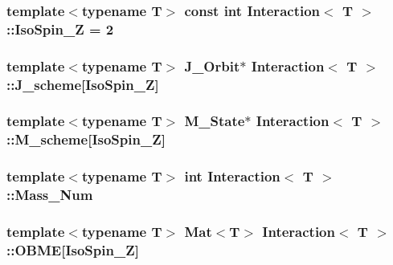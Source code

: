 \hypertarget{class_interaction_a067c62aec0e8fba647d5e5cefb13fadc}{
\subsubsection[{Iso\-Spin\-\_\-\-Z}]{\setlength{\rightskip}{0pt plus 5cm}template$<$typename T$>$ const int {\bf Interaction}$<$ T $>$\-::Iso\-Spin\-\_\-\-Z = 2\hspace{0.3cm}{\ttfamily [static]}}}\label{class_interaction_a067c62aec0e8fba647d5e5cefb13fadc}
\hypertarget{class_interaction_a42d5c1378bd17f7755424f7ab5702ef6}{
\subsubsection[{J\-\_\-scheme}]{\setlength{\rightskip}{0pt plus 5cm}template$<$typename T$>$ {\bf J\-\_\-\-Orbit}$\ast$ {\bf Interaction}$<$ T $>$\-::J\-\_\-scheme\mbox{[}{\bf Iso\-Spin\-\_\-\-Z}\mbox{]}}}\label{class_interaction_a42d5c1378bd17f7755424f7ab5702ef6}
\hypertarget{class_interaction_ad29cbf9eca392e71958932cef5f7bf66}{
\subsubsection[{M\-\_\-scheme}]{\setlength{\rightskip}{0pt plus 5cm}template$<$typename T$>$ {\bf M\-\_\-\-State}$\ast$ {\bf Interaction}$<$ T $>$\-::M\-\_\-scheme\mbox{[}{\bf Iso\-Spin\-\_\-\-Z}\mbox{]}}}\label{class_interaction_ad29cbf9eca392e71958932cef5f7bf66}
\hypertarget{class_interaction_a5a8eceab2bed942ec46d581b4cd4a661}{
\subsubsection[{Mass\-\_\-\-Num}]{\setlength{\rightskip}{0pt plus 5cm}template$<$typename T$>$ int {\bf Interaction}$<$ T $>$\-::Mass\-\_\-\-Num\hspace{0.3cm}{\ttfamily [private]}}}\label{class_interaction_a5a8eceab2bed942ec46d581b4cd4a661}
\hypertarget{class_interaction_ad629df71841bfb02116616b2f4764811}{
\subsubsection[{O\-B\-M\-E}]{\setlength{\rightskip}{0pt plus 5cm}template$<$typename T$>$ Mat$<$T$>$ {\bf Interaction}$<$ T $>$\-::O\-B\-M\-E\mbox{[}{\bf Iso\-Spin\-\_\-\-Z}\mbox{]}}}\label{class_interaction_ad629df71841bfb02116616b2f4764811}
